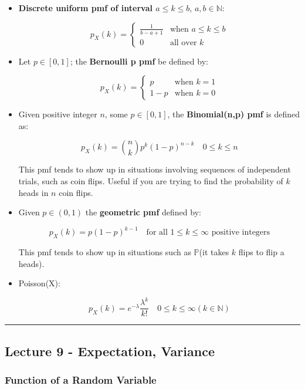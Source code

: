 \documentclass{article}
\begin{document}
\begin{itemize}
\item \textbf{Discrete uniform pmf of interval $a \leq k \leq b$},
  $a, b \in \mathbb{N}$:
  
  \[
    p_X(k) =
    \begin{cases}
      \frac{1}{b - a + 1} & \text{when } a \leq k \leq b \\
      0 & \text{all over } k
    \end{cases}
  \]

\item Let $p \in [0,1]$; the \textbf{Bernoulli p pmf} be defined by:
  
  \[
    p_X(k) =
    \begin{cases}
      p & \text{when } k = 1 \\
      1 - p & \text{when } k = 0
    \end{cases}
  \]
    
\item Given positive integer $n$, some $p \in [0,1]$, the
  \textbf{Binomial(n,p) pmf} is defined as:

  \[
    p_X(k) = {n \choose k} p^k (1 - p)^{n-k} \quad 0 \leq k \leq n
  \]

  This pmf tends to show up in situations involving sequences of
  independent trials, such as coin flips. Useful if you are trying to
  find the probability of $k$ heads in $n$ coin flips.

\item Given $p \in (0, 1)$ the \textbf{geometric pmf} defined by:

  \[
    p_X(k) = p (1-p)^{k-1} \quad \text{for all } 1 \leq k \leq \infty
    \text{ positive integers}
  \]

  This pmf tends to show up in situations such as $\mathbb{P}$(it
  takes $k$ flips to flip a heads).

\item Poisson(X):

  \[
    p_X(k) = e^{-\lambda} \frac{\lambda^{k}}{k!} \quad 0 \leq k \leq
    \infty (k \in \mathbb{N})
  \]
\end{itemize}


\medskip\hrule
\subsection{Lecture 9 - Expectation, Variance}

\subsubsection{Function of a Random Variable}
\end{document}
